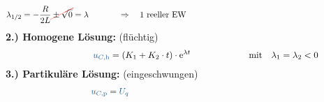 \begin{frame}[t]
\begin{align*}
        \lambda_{1/2} &= -\frac{R}{2L} \redcancel{ {} \pm {} \sqrt{0}} = \lambda
            &&\Rightarrow\quad \text{1 reeller EW}
    \\[-15pt] &\hphantom{1rrrrrrrrrrrrrrrr} &   \hphantom{2llllll}&\hphantom{\mathrel{\phantom{=}}2rrrrrrrrrrrrrrrrrrrrrrrrrrr}     &&\hphantom{3rrrrrrrrrrrrrrrrrrrrrrrr} \nonumber
\end{align*}%
\pause%
\textbf{2.) Homogene Lösung:} (flüchtig)
\begin{align}
    &&
        \ecv{u_{C,\mathrm{h}}} &= \left( K_1 + K_2 \cdot t \right) \cdot \mathrm{e}^{\lambda t}
    &&\text{mit}\quad \lambda_1 = \lambda_2 < 0  \label{eq:dgl:rlc:homolsg:grenzfall}
    \\[-15pt] &\hphantom{1rrrrrrrrrrrrrrrr} &   \hphantom{2llllll}&\hphantom{\mathrel{\phantom{=}}2rrrrrrrrrrrrrrrrrrrrrrrrrrr}     &&\hphantom{3rrrrrrrrrrrrrrrrrrrrrrrr} \nonumber
\end{align}%
\textbf{3.) Partikuläre Lösung:} (eingeschwungen)%
\begin{align*}
    &&
        \ecv{u_{C,\mathrm{p}}} &= \ecv{U_q}
    \\[-15pt] &\hphantom{1rrrrrrrrrrrrrrrr} &   \hphantom{2llllll}&\hphantom{\mathrel{\phantom{=}}2rrrrrrrrrrrrrrrrrrrrrrrrrrr}     &&\hphantom{3rrrrrrrrrrrrrrrrrrrrrrrr} \nonumber
    \end{align*}
\end{frame}


